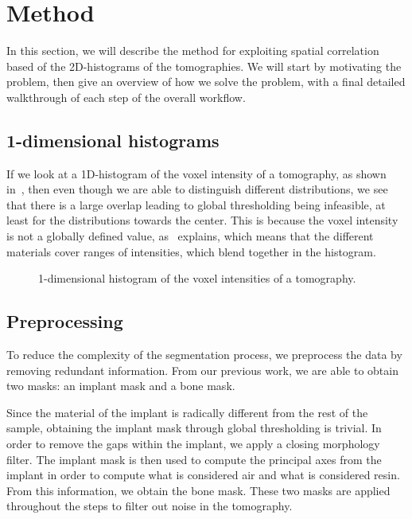 \section{Method}\label{sec:method}
In this section, we will describe the method for exploiting spatial correlation based of the 2D-histograms of the tomographies.
We will start by motivating the problem, then give an overview of how we solve the problem, with a final detailed walkthrough of each step of the overall workflow.

\subsection{1-dimensional histograms}
If we look at a 1D-histogram of the voxel intensity of a tomography, as shown in~, then even though we are able to distinguish different distributions, we see that there is a large overlap leading to global thresholding being infeasible, at least for the distributions towards the center.
This is because the voxel intensity is not a globally defined value, as~ explains, which means that the different materials cover ranges of intensities, which blend together in the histogram.

\begin{figure}
    \centering
    \caption{1-dimensional histogram of the voxel intensities of a tomography.}
    \label{fig:1d-hist}
\end{figure}

\subsection{Preprocessing}\label{sec:preprocess}
To reduce the complexity of the segmentation process, we preprocess the data by removing redundant information.
From our previous work, we are able to obtain two masks: an implant mask and a bone mask.

Since the material of the implant is radically different from the rest of the sample, obtaining the implant mask through global thresholding is trivial. In order to remove the gaps within the implant, we apply a closing morphology filter. The implant mask is then used to compute the principal axes from the implant in order to compute what is considered air and what is considered resin. From this information, we obtain the bone mask. These two masks are applied throughout the steps to filter out noise in the tomography.

